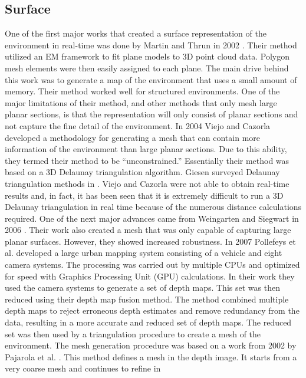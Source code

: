 \subsection{Surface}

One of the first major works that created a surface representation of the
environment in real-time was done by Martin and Thrun in 2002 \cite{Martin2002}.
Their method utilized an EM framework to fit plane models to 3D point cloud
data. Polygon mesh elements were then easily assigned to each plane. The main
drive behind this work was to generate a map of the environment that uses a
small amount of memory. Their  method worked well for structured environments.
One of the major limitations of their method, and other methods that only mesh
large planar sections, is that the representation will only consist of planar
sections and not capture the fine detail of the environment. In 2004 Viejo and
Cazorla \cite{Viejo2004} developed a methodology for generating a mesh that can
contain more information of the environment than large planar sections. Due to
this ability, they termed their method to be ``unconstrained.'' Essentially
their method was based on a 3D Delaunay triangulation algorithm. Giesen surveyed
Delaunay triangulation methods in \cite{Giesen2004}. Viejo and Cazorla were not
able to obtain real-time results and, in fact, it has been seen that it is
extremely difficult to run a 3D Delaunay triangulation in real time because of
the numerous distance calculations required. One of the next major advances
came from Weingarten and Siegwart in 2006 \cite{Weingarten2006}. Their work also
created a mesh that was only capable of capturing large planar surfaces.
However, they showed increased robustness. In 2007 Pollefeys et al.
\cite{Akbarzadeh2006,Pollefeys2007} developed a large urban mapping system
consisting of a vehicle and eight camera systems. The processing was carried out
by multiple CPUs and optimized for speed with Graphics Processing Unit (GPU)
calculations. In their work they used the camera systems to generate a set of
depth maps. This set was then reduced using their depth map fusion method. The
method combined multiple depth maps to reject erroneous depth estimates and
remove redundancy from the data, resulting in a more accurate and reduced set of
depth maps. The reduced set was then used by a triangulation procedure to create
a mesh of the environment. The mesh generation procedure was based on a work
from 2002 by Pajarola et al. \cite{Pajarola2002}. This method defines a mesh in
the depth image. It starts from a very coarse mesh and continues to refine in
